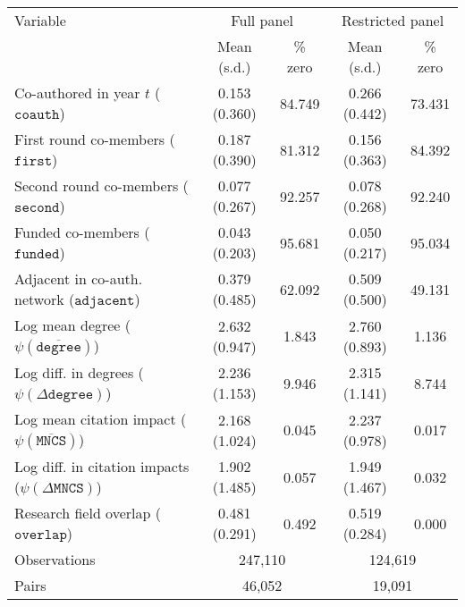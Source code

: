 \begin{tabular}{lcccc}
\toprule
Variable & \multicolumn{2}{c}{Full panel} & \multicolumn{2}{c}{Restricted panel} \\
\cmidrule(lr){2-3} \cmidrule(lr){4-5}
& Mean (s.d.) & \% zero & Mean (s.d.) & \% zero \\
\midrule
Co-authored in year $t$ ($\mathtt{coauth}$) & 0.153 (0.360) & 84.749 & 0.266 (0.442) & 73.431\\
First round co-members ($\mathtt{first}$) & 0.187 (0.390) & 81.312 & 0.156 (0.363) & 84.392\\
Second round co-members ($\mathtt{second}$) & 0.077 (0.267) & 92.257 & 0.078 (0.268) & 92.240\\
Funded co-members ($\mathtt{funded}$) & 0.043 (0.203) & 95.681 & 0.050 (0.217) & 95.034\\
Adjacent in co-auth. network ($\mathtt{adjacent}$) & 0.379 (0.485) & 62.092 & 0.509 (0.500) & 49.131\\
Log mean degree ($\psi(\overline{\mathtt{degree}})$) & 2.632 (0.947) & 1.843 & 2.760 (0.893) & 1.136\\
Log diff. in degrees ($\psi(\Delta\mathtt{degree})$) & 2.236 (1.153) & 9.946 & 2.315 (1.141) & 8.744\\
Log mean citation impact ($\psi(\overline{\mathtt{MNCS}})$) & 2.168 (1.024) & 0.045 & 2.237 (0.978) & 0.017\\
Log diff. in citation impacts ($\psi(\Delta\mathtt{MNCS})$) & 1.902 (1.485) & 0.057 & 1.949 (1.467) & 0.032\\
Research field overlap ($\mathtt{overlap}$) & 0.481 (0.291) & 0.492 & 0.519 (0.284) & 0.000\\
\midrule
Observations & \multicolumn{2}{c}{247,110} & \multicolumn{2}{c}{124,619} \\
Pairs & \multicolumn{2}{c}{46,052} & \multicolumn{2}{c}{19,091} \\
\bottomrule
\end{tabular}
